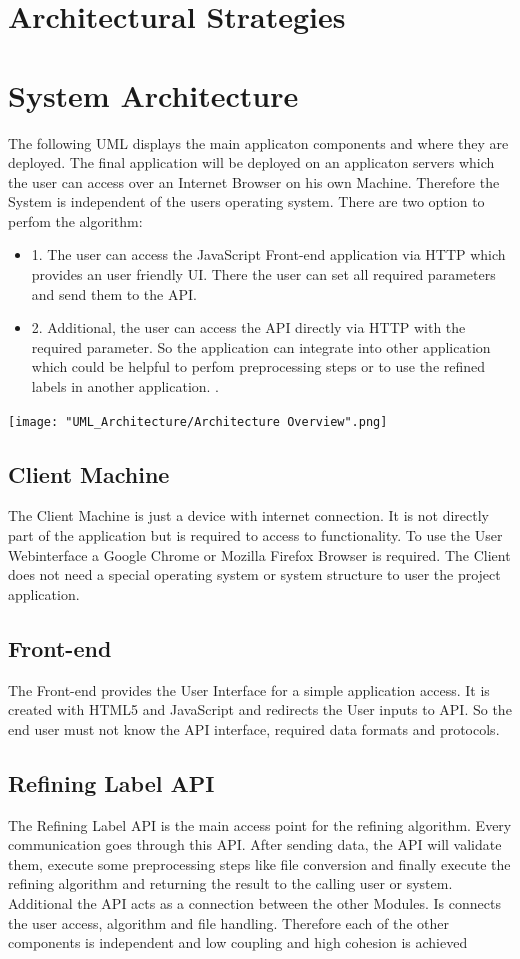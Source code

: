 \documentclass[notitlepage]{article}
\begin{document}
\begin{flushleft}
\section{Architectural Strategies}

\section{System Architecture}
The following UML displays the main applicaton components and where they are deployed. The final application will be deployed on an applicaton servers which the 
user can access over an Internet Browser on his own Machine. Therefore the System is independent of the users operating system. There are two option to perfom the 
algorithm:

\begin{itemize}
	\item 1. The user can access the JavaScript Front-end application via HTTP which provides an user friendly UI. There the user can set all required parameters and send them to the API.
	\item 2. Additional, the user can access the API directly via HTTP with the required parameter. So the application can integrate into other application which could be helpful to perfom preprocessing steps or to use the refined labels in another application. .
\end{itemize}


\texttt{[image: "UML\_Architecture/Architecture Overview".png]}

\subsection{Client Machine}
The Client Machine is just a device with internet connection. It is not directly part of the application but is required to access to functionality.
To use the User Webinterface a Google Chrome or Mozilla Firefox Browser is required. The Client does not need a special operating system or system structure to user 
the project application.
\subsection{Front-end}
The Front-end provides the User Interface for a simple application access. It is created with HTML5 and JavaScript and redirects the User inputs to API.
So the end user must not know the API interface, required data formats and protocols.
\subsection{Refining Label API}
The Refining Label API is the main access point for the refining algorithm. Every communication goes through this API. After sending data, 
the API will validate them, execute some preprocessing steps like file conversion and finally execute the refining algorithm and returning the result to the calling user or system. 
Additional the API acts as a connection between the other Modules. Is connects the user access, algorithm and file handling.
Therefore each of the other components is independent and low coupling and high cohesion is achieved   

\end{flushleft}
\end{document}
